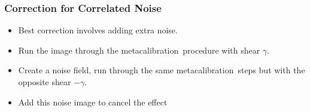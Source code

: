 \documentclass{beamer}
\newcommand{\mcal}{metacalibration}
\begin{document}
\frame
{
    \frametitle{Correction for Correlated Noise}

 
    \begin{itemize}

        \item Best correction involves adding {\color{lightskyblue} extra noise}.

        \item Run the image through the \mcal\ procedure with
            shear $\gamma$.

        \item Create a noise field, run through the same \mcal\ steps but with
            the {\color{lightskyblue} opposite shear} $-\gamma$.

        \item Add this noise image to cancel the effect

    \end{itemize}

}






\end{document}
